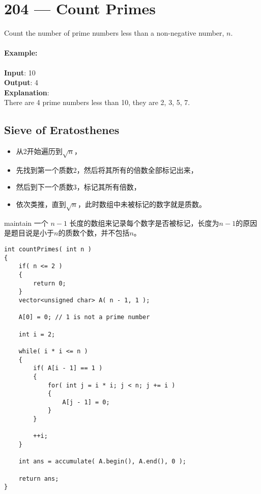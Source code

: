 \section{204 --- Count Primes}
Count the number of prime numbers less than a non-negative number, $n$.
\paragraph{Example:}

\begin{flushleft}
\textbf{Input}: 10
\\
\textbf{Output}: 4
\\
\textbf{Explanation}: 
\\
There are 4 prime numbers less than 10, they are 2, 3, 5, 7.
\end{flushleft}
\subsection{Sieve of Eratosthenes}
\begin{itemize}
\item 从2开始遍历到$\sqrt{n}$，
\item 先找到第一个质数2，然后将其所有的倍数全部标记出来，
\item 然后到下一个质数3，标记其所有倍数，
\item 依次类推，直到$\sqrt{n}$，此时数组中未被标记的数字就是质数。
\end{itemize}
maintain 一个 $n-1$ 长度的数组来记录每个数字是否被标记，长度为$n-1$的原因是题目说是小于$n$的质数个数，并不包括$n$。

\setcounter{lstlisting}{0}
\begin{lstlisting}[style=customc, caption={Sieve of Eratosthenes}]
int countPrimes( int n )
{
    if( n <= 2 )
    {
        return 0;
    }
    vector<unsigned char> A( n - 1, 1 );

    A[0] = 0; // 1 is not a prime number

    int i = 2;

    while( i * i <= n )
    {
        if( A[i - 1] == 1 )
        {
            for( int j = i * i; j < n; j += i )
            {
                A[j - 1] = 0;
            }
        }

        ++i;
    }

    int ans = accumulate( A.begin(), A.end(), 0 );

    return ans;
}
\end{lstlisting}